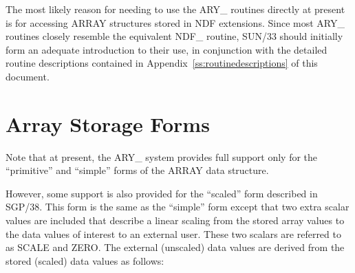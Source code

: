 \documentclass[twoside,11pt]{article}
\newcommand{\xref}[3]{#1}
\newcommand{\xlabel}[1]{}
\begin{document}
The most likely reason for needing to use the ARY\_ routines directly at
present is for accessing ARRAY structures stored in NDF extensions.
Since most ARY\_ routines closely resemble the equivalent NDF\_ routine,
\xref{SUN/33}{sun33}{} should initially form an adequate introduction to 
their use, in conjunction with the detailed routine descriptions contained in 
Appendix~\ref{ss:routinedescriptions} of this document. 



\section{\xlabel{array_storage_forms}Array Storage Forms}
\label{array_storage_forms}

Note that at present, the ARY\_ system provides full support only for the 
``primitive'' and ``simple'' forms of the ARRAY data structure. 

However, some support is also provided for the ``scaled'' form described
in SGP/38. This form is the same as the ``simple'' form except that two
extra scalar values are included that describe a linear scaling from the
stored array values to the data values of interest to an external user.
These two scalars are referred to as SCALE and ZERO. The external
(unscaled) data values are derived from the stored (scaled) data values
as follows:
\end{document}
